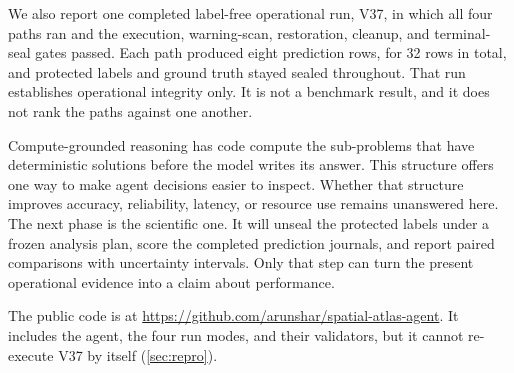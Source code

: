 \documentclass{article}
\begin{document}
We also report one completed label-free operational run, V37, in which all four paths ran and the execution, warning-scan, restoration, cleanup, and terminal-seal gates passed. Each path produced eight prediction rows, for 32 rows in total, and protected labels and ground truth stayed sealed throughout. That run establishes operational integrity only. It is not a benchmark result, and it does not rank the paths against one another.

Compute-grounded reasoning has code compute the sub-problems that have deterministic solutions before the model writes its answer. This structure offers one way to make agent decisions easier to inspect. Whether that structure improves accuracy, reliability, latency, or resource use remains unanswered here. The next phase is the scientific one. It will unseal the protected labels under a frozen analysis plan, score the completed prediction journals, and report paired comparisons with uncertainty intervals. Only that step can turn the present operational evidence into a claim about performance.

The public code is at \url{https://github.com/arunshar/spatial-atlas-agent}. It includes the agent, the four run modes, and their validators, but it cannot re-execute V37 by itself (\cref{sec:repro}).
\end{document}
